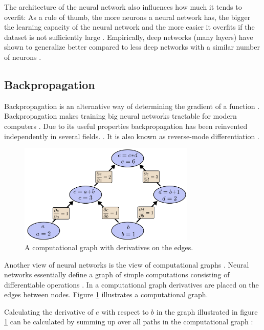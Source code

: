 \documentclass[draft,final,oneside]{vutinfth} %
\begin{document}
The architecture of the neural network also influences how much it tends to overfit: As a rule of thumb, the more neurons a neural network has, the bigger the learning capacity of the neural network and the more easier it overfits if the dataset is not sufficiently large \cite{Goodfellow-et-al-2016}. Empirically, deep networks (many layers) have shown to generalize better compared to less deep networks with a similar number of neurons \cite{Goodfellow-et-al-2016}.

\pagebreak
\subsection{Backpropagation} \label{backprop}

Backpropagation is an alternative way of determining the gradient of a function \cite{Goodfellow-et-al-2016}. Backpropagation makes training big neural networks tractable for modern computers \cite{bishop}. Due to its useful properties backpropagation has been reinvented independently in several fields. \cite{Griewank2012WhoIT}. It is also known as reverse-mode differentiation \cite{colahbackprop}.

\begin{figure}[ht]
	\centering
  	\includegraphics[width=0.75\textwidth]{graphics/computationgraph.png}
	\caption{A computational graph with derivatives on the edges. \cite{colahbackprop}}
	\label{fig:computationgraph}
\end{figure}


Another view of neural networks is the view of computational graphs \cite{Goodfellow-et-al-2016}. Neural networks essentially define a graph of simple computations consisting of differentiable operations \cite{Goodfellow-et-al-2016}. In a computational graph derivatives are placed on the edges between nodes. Figure \ref{fig:computationgraph} illustrates a computational graph.

Calculating the derivative of $e$ with respect to $b$ in the graph illustrated in figure \ref{fig:computationgraph} can be calculated by summing up over all paths in the computational graph \cite{colahbackprop}:
\end{document}
